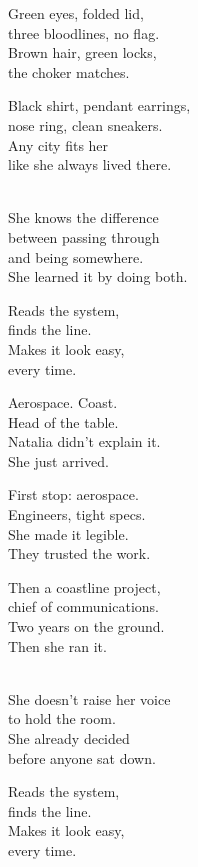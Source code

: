 \begin{lyrics}

Green eyes, folded lid,\\
three bloodlines, no flag.\\
Brown hair, green locks,\\
the choker matches.

Black shirt, pendant earrings,\\
nose ring, clean sneakers.\\
Any city fits her\\
like she always lived there.

\\
She knows the difference\\
between passing through\\
and being somewhere.\\
She learned it by doing both.

Reads the system,\\
finds the line.\\
Makes it look easy,\\
every time.

Aerospace. Coast.\\
Head of the table.\\
Natalia didn't explain it.\\
She just arrived.

First stop: aerospace.\\
Engineers, tight specs.\\
She made it legible.\\
They trusted the work.

Then a coastline project,\\
chief of communications.\\
Two years on the ground.\\
Then she ran it.

\\
She doesn't raise her voice\\
to hold the room.\\
She already decided\\
before anyone sat down.

Reads the system,\\
finds the line.\\
Makes it look easy,\\
every time.


\end{lyrics}

